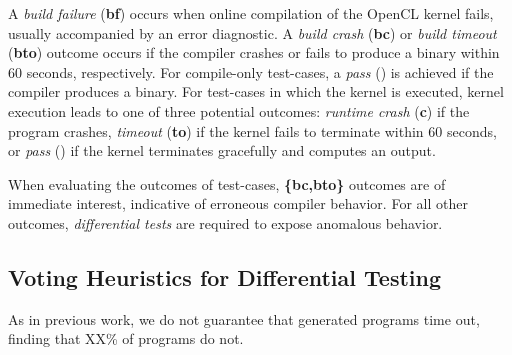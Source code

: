 A \emph{build failure} (\textbf{bf}) occurs when online compilation of the OpenCL kernel fails, usually accompanied by an error diagnostic. A \emph{build crash} (\textbf{bc}) or \emph{build timeout} (\textbf{bto}) outcome occurs if the compiler crashes or fails to produce a binary within 60 seconds, respectively. For compile-only test-cases, a \emph{pass} (\textbf{\cmark}) is achieved if the compiler produces a binary. For test-cases in which the kernel is executed, kernel execution leads to one of three potential outcomes: \emph{runtime crash} (\textbf{c}) if the program crashes, \emph{timeout} (\textbf{to}) if the kernel fails to terminate within 60 seconds, or \emph{pass} (\textbf{\cmark}) if the kernel terminates gracefully and computes an output. 
%

When evaluating the outcomes of test-cases, \textbf{\{bc,bto\}} outcomes are of immediate interest, indicative of erroneous compiler behavior. For all other outcomes, \emph{differential tests} are required to expose anomalous behavior.


\subsection{Voting Heuristics for Differential Testing}

As in previous work, we do not guarantee that generated programs time out, finding that XX\% of programs do not.

